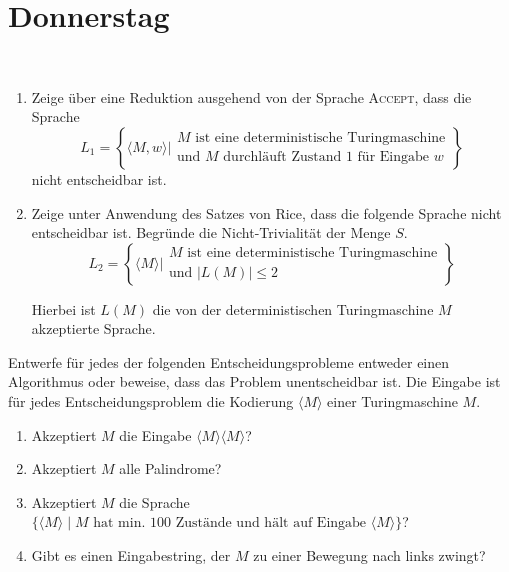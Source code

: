 \documentclass{uebung_cs}
\begin{document}
\section*{Donnerstag}

\begin{exercise}[Entscheidbarkeit II][\href{https://moodle.studiumdigitale.uni-frankfurt.de/moodle/mod/assign/view.php?id=245311}{Moodle}\athome\medium]\
	\begin{enumerate}
		\item Zeige über eine Reduktion ausgehend von der Sprache \textsc{Accept}, dass die Sprache $$L_1 = \left\{\langle M,w\rangle \mathrel{\Bigg|} \begin{array}{l}M\text{ ist eine deterministische Turingmaschine}\\\text{und }M\text{ durchläuft Zustand 1 für Eingabe }w\end{array}\right\}$$ nicht entscheidbar ist.
		
		\item Zeige unter Anwendung des Satzes von Rice, dass die folgende Sprache nicht entscheidbar ist. Begründe die Nicht-Trivialität der Menge $S$.
 $$L_2 = \left\{\langle M\rangle \mathrel{\Bigg|} \begin{array}{l}M\text{ ist eine deterministische Turingmaschine}\\\text{und } |L(M)| \leq 2\end{array}\right\}$$
			
		Hierbei ist $L(M)$ die von der deterministischen Turingmaschine $M$ akzeptierte Sprache.
	\end{enumerate}
\end{exercise}

\begin{exercise}
	Entwerfe für jedes der folgenden Entscheidungsprobleme entweder einen Algorithmus oder beweise, dass das Problem unentscheidbar ist. Die Eingabe ist für jedes Entscheidungsproblem die Kodierung $\langle M \rangle$ einer Turingmaschine $M$.
	\begin{enumerate}
		\item Akzeptiert $M$ die Eingabe $\langle M \rangle \langle M \rangle$?
		\item Akzeptiert $M$ alle Palindrome?
		\item Akzeptiert $M$ die Sprache $\{\langle M \rangle \;|\; M \text{ hat min. 100 Zustände und hält auf Eingabe } \langle M \rangle\}$?
		\item Gibt es einen Eingabestring, der $M$ zu einer Bewegung nach links zwingt?
	\end{enumerate}
\end{exercise}
\end{document}
